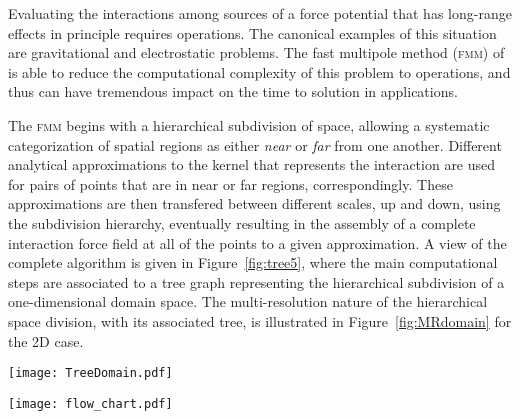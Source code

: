 \documentclass[10pt,twocolumn]{article}
\newcommand{\fmm}{\textsc{fmm}\xspace}
\newcommand{\ME}{\textsc{me}}
\newcommand{\LE}{\textsc{le}}
\newcommand{\MM}{\textsc{m}2\textsc{m}\xspace}
\newcommand{\PM}{\textsc{p}2\textsc{m}\xspace}
\newcommand{\ML}{\textsc{m}2\textsc{l}\xspace}
\newcommand{\LL}{\textsc{l}2\textsc{l}\xspace}
\newcommand{\LP}{\textsc{l}2\textsc{p}\xspace}
\newlength{\up}
\begin{document}
 Evaluating the interactions among  sources of a force potential that has long-range effects in principle requires  operations.  The canonical examples of this situation are gravitational and electrostatic problems. The fast multipole method (\fmm) of~\cite{GreengardRokhlin1987} is able to reduce the computational complexity of this problem to  operations, and thus can have tremendous impact on the time to solution in applications.

The \fmm  begins with a hierarchical subdivision of space, allowing a systematic categorization of spatial regions as either \emph{near} or \emph{far} from one another. 
 Different analytical approximations to the kernel that represents the interaction are used for pairs of points that are in near or far regions, correspondingly. 
These approximations are then transfered between different scales, up and down, using the subdivision hierarchy, eventually resulting in the assembly of a complete interaction force field at all of the points to a given approximation. 
A view of the complete algorithm is given in Figure~\ref{fig:tree5},  where the main computational steps are associated to a tree graph representing the hierarchical subdivision of a one-dimensional domain space.  The multi-resolution nature of the hierarchical space division, with its associated tree, is illustrated in Figure~\ref{fig:MRdomain} for the 2D case.


\begin{figure*}
	\centering
	{\texttt{[image: TreeDomain.pdf]}}
\caption{\small A three-level hierarchical decomposition of a 2D domain.  Tree nodes corresponding to domain boxes are shown in corresponding color. }
	\label{fig:MRdomain}
\end{figure*}

\begin{figure*}\begin{center}
\texttt{[image: flow\_chart.pdf]}
\end{center}
\vspace{-1em}\caption{Flow of the \fmm calculation, showing all of the operations required in the algorithms: 
      \PM: transformation of points into \ME s (points-to-multipole);
      \MM: translation of \ME s (multipole-to-multipole);
      \ML: transformation of an \ME\ into an \LE\ (multipole-to-local);
      \LL: translation of an \LE\ (local-to-local);
      \LP: evaluation of  \LE s at point locations (local-to-point).}
\label{fig:flow_chart}
\end{figure*}
\end{document}
